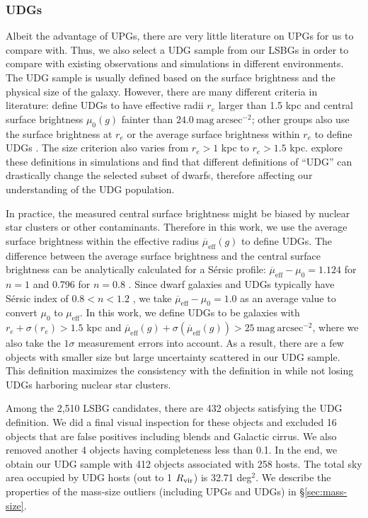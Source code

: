 \documentclass[twocolumn,astrosymb,twocolappendix]{aastex631}
\newcommand{\sbunit}{\mathrm{mag\ arcsec}^{-2}}
\newcommand{\sbeff}{\overline{\mu}_{\mathrm{eff}}(g)}
\newcommand{\sersic}{S\'ersic}
\begin{document}
\begin{CJK*}{UTF8}{gbsn}
\subsubsection{UDGs}
Albeit the advantage of UPGs, there are very little literature on UPGs for us to compare with. Thus, we also select a UDG sample from our LSBGs in order to compare with existing observations and simulations in different environments. The UDG sample is usually defined based on the surface brightness and the physical size of the galaxy. However, there are many different criteria in literature: \citet{vanDokkum2015} define UDGs to have effective radii $r_e$ larger than 1.5 kpc and central surface brightness $\mu_0(g)$ fainter than $24.0\ \sbunit$; other groups also use the surface brightness at $r_e$ \citep[e.g.,][]{DiCintio2017,Cardona-Barrero2020} or the average surface brightness within $r_e$ to define UDGs \citep[e.g.,][]{Koda2015,Yagi2016,vdBurg2016,Leisman2017,Martin2019}. The size criterion also varies from $r_e > 1$ kpc to $r_e > 1.5$ kpc. \citet{vanNest2022} explore these definitions in simulations and find that different definitions of ``UDG'' can drastically change the selected subset of dwarfs, therefore affecting our understanding of the UDG population.

In practice, the measured central surface brightness might be biased by nuclear star clusters \citep{Neumayer2020,ELVES-II,Somalwar2020} or other contaminants. Therefore in this work, we use the average surface brightness within the effective radius $\sbeff$ to define UDGs. The difference between the average surface brightness and the central surface brightness can be analytically calculated for a \sersic{} profile: $\overline{\mu}_{\mathrm{eff}} - \mu_0 = 1.124$ for $n=1$ and 0.796 for $n=0.8$ \citep{Graham2005,Yagi2016}. Since dwarf galaxies and UDGs typically have \sersic{} index of $0.8 < n < 1.2$ \citep[e.g.,][]{vanDokkum2015,ELVES-I}, we take $\overline{\mu}_{\mathrm{eff}} - \mu_0 = 1.0$ as an average value to convert $\mu_0$ to $\mu_{\mathrm{eff}}$. In this work, we define UDGs to be galaxies with $r_e+\sigma(r_e) > 1.5$ kpc and $\sbeff + \sigma(\sbeff) > 25\ \sbunit$, where we also take the $1\sigma$ measurement errors into account. As a result, there are a few objects with smaller size but large uncertainty scattered in our UDG sample. This definition maximizes the consistency with the definition in \citet{vanDokkum2015} while not losing UDGs harboring nuclear star clusters.

Among the 2,510 LSBG candidates, there are 432 objects satisfying the UDG definition. We did a final visual inspection for these objects and excluded 16 objects that are false positives including blends and Galactic cirrus. We also removed another 4 objects having completeness less than 0.1. In the end, we obtain our UDG sample with 412 objects associated with 258 hosts. The total sky area occupied by UDG hosts (out to 1 $R_{\rm{vir}}$) is 32.71 deg$^{2}$. We describe the properties of the mass-size outliers (including UPGs and UDGs) in \S\ref{sec:mass-size}.


\end{CJK*}
\end{document}
